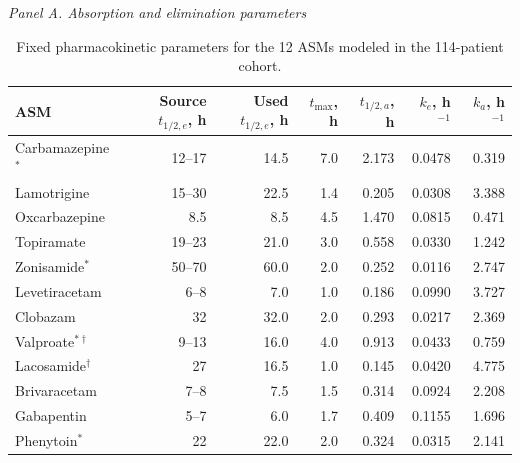 \documentclass[11pt]{article}
\begin{document}
\clearpage
\begin{table}[H]
\centering
\caption{Fixed pharmacokinetic parameters for the 12 ASMs modeled in the 114-patient cohort.}
\label{tab:pk-parameters}
\scriptsize
\textit{Panel A. Absorption and elimination parameters}\par\vspace{0.3em}
\begin{tabularx}{\textwidth}{@{}>{\raggedright\arraybackslash}X r r r r r r@{}}
\toprule
ASM & Source $t_{1/2,e}$, h & Used $t_{1/2,e}$, h & $t_{\max}$, h & $t_{1/2,a}$, h & $k_e$, h$^{-1}$ & $k_a$, h$^{-1}$ \\
\midrule
Carbamazepine$^{*}$ & 12--17 & 14.5 & 7.0 & 2.173 & 0.0478 & 0.319 \\
Lamotrigine & 15--30 & 22.5 & 1.4 & 0.205 & 0.0308 & 3.388 \\
Oxcarbazepine & 8.5 & 8.5 & 4.5 & 1.470 & 0.0815 & 0.471 \\
Topiramate & 19--23 & 21.0 & 3.0 & 0.558 & 0.0330 & 1.242 \\
Zonisamide$^{*}$ & 50--70 & 60.0 & 2.0 & 0.252 & 0.0116 & 2.747 \\
Levetiracetam & 6--8 & 7.0 & 1.0 & 0.186 & 0.0990 & 3.727 \\
Clobazam & 32 & 32.0 & 2.0 & 0.293 & 0.0217 & 2.369 \\
Valproate$^{*\dagger}$ & 9--13 & 16.0 & 4.0 & 0.913 & 0.0433 & 0.759 \\
Lacosamide$^{\dagger}$ & 27 & 16.5 & 1.0 & 0.145 & 0.0420 & 4.775 \\
Brivaracetam & 7--8 & 7.5 & 1.5 & 0.314 & 0.0924 & 2.208 \\
Gabapentin & 5--7 & 6.0 & 1.7 & 0.409 & 0.1155 & 1.696 \\
Phenytoin$^{*}$ & 22 & 22.0 & 2.0 & 0.324 & 0.0315 & 2.141 \\
\bottomrule
\end{tabularx}


\end{table}
\end{document}

